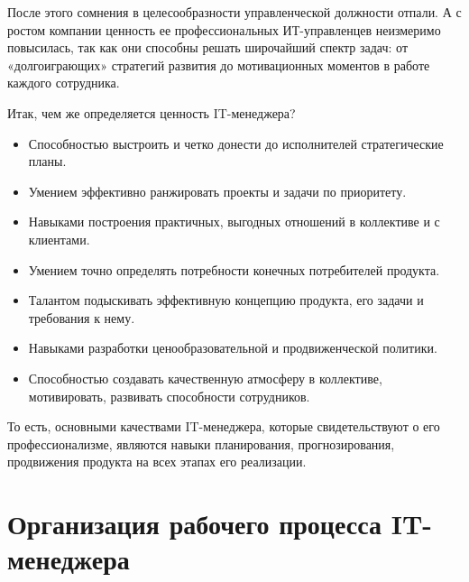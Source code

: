 \documentclass{../industrial-development}
\begin{document}
После этого сомнения в целесообразности управленческой должности отпали. А с ростом компании ценность ее профессиональных ИТ-управленцев неизмеримо повысилась, так как они способны решать широчайший спектр задач: от «долгоиграющих» стратегий развития до мотивационных моментов в работе каждого сотрудника.

Итак, чем же определяется ценность IT-менеджера?
\begin{itemize}	
\item Способностью выстроить и четко донести до исполнителей стратегические планы.
\item Умением эффективно ранжировать проекты и задачи по приоритету.
\item Навыками построения практичных, выгодных отношений в коллективе и с клиентами.
\item Умением точно определять потребности конечных потребителей продукта.
\item Талантом подыскивать эффективную концепцию продукта, его задачи и требования к нему.
\item Навыками разработки ценообразовательной и продвиженческой политики.
\item Способностью создавать качественную атмосферу в коллективе, мотивировать, развивать способности сотрудников.
 \end{itemize}
То есть, основными качествами IT-менеджера, которые свидетельствуют о его профессионализме, являются навыки планирования, прогнозирования, продвижения продукта на всех этапах его реализации.

\section{Организация рабочего процесса IT-менеджера}
\end{document}
